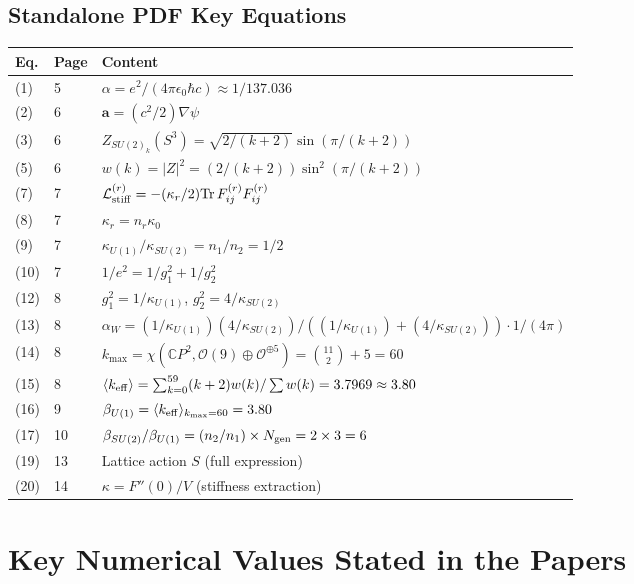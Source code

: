 \documentclass[12pt,a4paper]{article}
\begin{document}
\subsection{Standalone PDF Key Equations}

\begin{longtable}{p{}p{}p{}}
\toprule
\textbf{Eq.} & \textbf{Page} & \textbf{Content} \\
\midrule
(1) & 5 & $\alpha = e^2/(4\pi\epsilon_0\hbar c) \approx 1/137.036$ \\
(2) & 6 & $\mathbf{a} = (c^2/2)\nabla\psi$ \\
(3) & 6 & $Z_{SU(2)_k}(S^3) = \sqrt{2/(k+2)}\sin(\pi/(k+2))$ \\
(5) & 6 & $w(k) = |Z|^2 = (2/(k+2))\sin^2(\pi/(k+2))$ \\
(7) & 7 & $\mathcal{L}_{\rm stiff}^{(r)} = -(\kappa_r/2)\mathrm{Tr}\,F_{ij}^{(r)}F_{ij}^{(r)}$ \\
(8) & 7 & $\kappa_r = n_r\kappa_0$ \\
(9) & 7 & $\kappa_{U(1)}/\kappa_{SU(2)} = n_1/n_2 = 1/2$ \\
(10) & 7 & $1/e^2 = 1/g_1^2 + 1/g_2^2$ \\
(12) & 8 & $g_1^2 = 1/\kappa_{U(1)}$, $g_2^2 = 4/\kappa_{SU(2)}$ \\
(13) & 8 & $\alpha_W = (1/\kappa_{U(1)})(4/\kappa_{SU(2)})/((1/\kappa_{U(1)}) + (4/\kappa_{SU(2)})) \cdot 1/(4\pi)$ \\
(14) & 8 & $k_{\max} = \chi(\mathbb{C}P^2, \mathcal{O}(9)\oplus\mathcal{O}^{\oplus 5}) = \binom{11}{2} + 5 = 60$ \\
(15) & 8 & $\langle k_{\rm eff}\rangle = \sum_{k=0}^{59}(k+2)w(k) / \sum w(k) = 3.7969 \approx 3.80$ \\
(16) & 9 & $\beta_{U(1)} = \langle k_{\rm eff}\rangle_{k_{\max}=60} = 3.80$ \\
(17) & 10 & $\beta_{SU(2)}/\beta_{U(1)} = (n_2/n_1) \times N_{\rm gen} = 2 \times 3 = 6$ \\
(19) & 13 & Lattice action $S$ (full expression) \\
(20) & 14 & $\kappa = F''(0)/V$ (stiffness extraction) \\
\bottomrule
\end{longtable}

\section{Key Numerical Values Stated in the Papers}
\label{sec:numerics}
\end{document}
